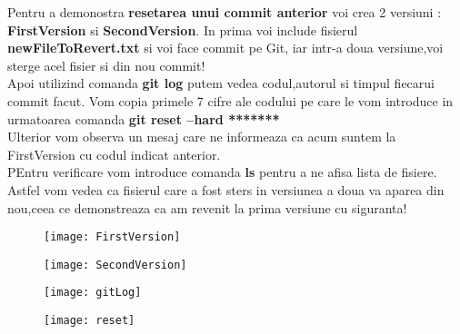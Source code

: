 \tab Pentru a demonostra \textbf{resetarea unui commit anterior} voi crea 2 versiuni : \textbf{FirstVersion} si \textbf{SecondVersion}. In prima voi include fisierul \textbf{newFileToRevert.txt} si voi face commit pe Git, iar intr-a doua versiune,voi sterge acel fisier si din nou commit!\\
Apoi utilizind comanda \textbf{git log} putem vedea codul,autorul si timpul fiecarui commit facut. Vom copia primele 7 cifre ale codului pe care le vom introduce in urmatoarea comanda \textbf{git reset --hard ******* }\\
Ulterior vom observa un mesaj care ne informeaza ca acum suntem la FirstVersion cu codul indicat anterior.\\
PEntru verificare vom introduce comanda \textbf{ls} pentru a ne afisa lista de fisiere. Astfel vom vedea ca fisierul care a fost sters in versiunea a doua va aparea din nou,ceea ce demonstreaza ca am revenit la prima versiune cu siguranta!\\

\begin{figure}[h]
\centering
\texttt{[image: FirstVersion]}
\end{figure}
\clearpage

\begin{figure}[h]
\centering
\texttt{[image: SecondVersion]}
\end{figure}
\begin{figure}[h]
\centering
\texttt{[image: gitLog]}
\end{figure}
\begin{figure}[h]
\centering
\texttt{[image: reset]}
\end{figure}

\clearpage
\clearpage